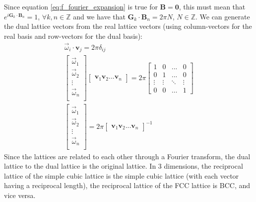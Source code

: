 \documentclass[12pt]{article}
\begin{document}
Since equation \ref{eq:f_fourier_expansion} is true for $\mathbf{B} = \mathbf{0}$, this must mean that $e^{i\mathbf G_k\cdot \mathbf B_n} = 1$, $\forall k, n \in \mathbb{Z} $ and we have that $\mathbf G_k \cdot \mathbf B_n = 2\pi N$, $N\in \mathbb{Z}$. We can generate the dual lattice vectors from the real lattice vectors (using column-vectors for the real basis and row-vectors for the dual basis): 
\begin{gather}
	\vec{\omega}_i\cdot \mathbf{v}_j = 2\pi\delta_{ij} \\
	\begin{bmatrix} 
		\vec{\omega}_1 \\
		\vec{\omega}_2 \\
		\vdots \\
		\vec{\omega}_n \\
	\end{bmatrix}
	\begin{bmatrix}
		\mathbf{v}_1
		\mathbf{v}_2
		...
		\mathbf{v}_n
	\end{bmatrix} = 2\pi
	\begin{bmatrix}
		1 & 0  & ... & 0 \\
		0 & 1 &  ... & 0  \\
		\vdots & \vdots & \ddots & \vdots \\
		0 & 0 & \hdots & 1 
	\end{bmatrix}
	\\
	\begin{bmatrix} 
		\vec{\omega}_1 \\
		\vec{\omega}_2 \\
		\vdots \\
		\vec{\omega}_n \\
	\end{bmatrix}
	= 2\pi
	\begin{bmatrix}
		\mathbf{v}_1
		\mathbf{v}_2
		...
		\mathbf{v}_n
	\end{bmatrix} ^{-1}
\end{gather}
Since the lattices are related to each other through a Fourier transform, the dual lattice to the dual lattice is the original lattice.
In 3 dimensions, the reciprocal lattice of the simple cubic lattice is the simple cubic lattice 
(with each vector having a reciprocal length), the reciprocal lattice of the FCC lattice is BCC, and vice versa.
\end{document}

